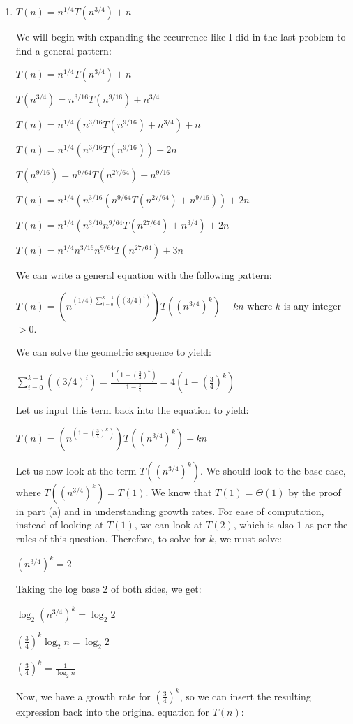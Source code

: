 \documentclass[11pt]{article}
\begin{document}
\begin{enumerate}
\item $T(n) = n^{1/4} T(n^{3/4}) + n$

We will begin with expanding the recurrence like I did in the last problem to find a general pattern: 

$T(n) = n^{1/4} T(n^{3/4}) + n$

$T(n^{3/4}) = n^{3/16} T(n^{9/16}) + n^{3/4}$

$T(n) = n^{1/4} (n^{3/16} T(n^{9/16}) + n^{3/4}) + n$

$T(n) = n^{1/4} (n^{3/16} T(n^{9/16})) + 2n$

$T(n^{9/16}) = n^{9/64} T(n^{27/64}) + n^{9/16}$

$T(n) = n^{1/4} (n^{3/16}(n^{9/64} T(n^{27/64}) + n^{9/16})) + 2n$

$T(n) = n^{1/4} (n^{3/16} n^{9/64} T(n^{27/64}) + n^{3/4}) + 2n$

$T(n) = n^{1/4} n^{3/16} n^{9/64} T(n^{27/64}) + 3n$

We can write a general equation with the following pattern:

$T(n) = (n^{(1/4)\sum_{i=0}^{k-1}((3/4)^i)}) T((n^{3/4})^k) + kn$ where $k$ is any integer $> 0$.

We can solve the geometric sequence to yield:

$\sum_{i=0}^{k-1}((3/4)^i) = \frac{1(1-(\frac{3}{4})^k)}{1-\frac{3}{4}} = 4(1-(\frac{3}{4})^k)$

Let us input this term back into the equation to yield:

$T(n) = (n^{(1-(\frac{3}{4})^k)}) T((n^{3/4})^k) + kn$

Let us now look at the term $T((n^{3/4})^k)$. We should look to the base case, where $T((n^{3/4})^k) = T(1)$. 
We know that $T(1) = \Theta(1)$ by the proof in part (a) and in understanding growth rates. 
For ease of computation, instead of looking at $T(1)$, we can look at $T(2)$, which is also $1$ as per the rules of this question. 
Therefore, to solve for $k$, we must solve:

$(n^{3/4})^k = 2$

Taking the log base 2 of both sides, we get:

$\log_{2} (n^{3/4})^k = \log_{2} 2$

$(\frac{3}{4})^k \log_{2} n = \log_{2} 2$

$(\frac{3}{4})^k = \frac{1}{\log_{2} n}$

Now, we have a growth rate for $(\frac{3}{4})^k$, so we can insert the resulting expression back into the original equation for $T(n)$:


\end{enumerate}
\end{document}
